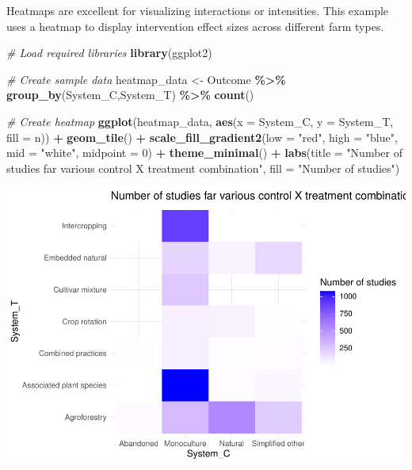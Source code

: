 \documentclass[
]{book}
\newenvironment{Shaded}{\begin{snugshade}}{\end{snugshade}}
\newcommand{\AttributeTok}[1]{\textcolor[rgb]{0.13,0.29,0.53}{#1}}
\newcommand{\CommentTok}[1]{\textcolor[rgb]{0.56,0.35,0.01}{\textit{#1}}}
\newcommand{\DecValTok}[1]{\textcolor[rgb]{0.00,0.00,0.81}{#1}}
\newcommand{\FunctionTok}[1]{\textcolor[rgb]{0.13,0.29,0.53}{\textbf{#1}}}
\newcommand{\NormalTok}[1]{#1}
\newcommand{\OtherTok}[1]{\textcolor[rgb]{0.56,0.35,0.01}{#1}}
\newcommand{\SpecialCharTok}[1]{\textcolor[rgb]{0.81,0.36,0.00}{\textbf{#1}}}
\newcommand{\StringTok}[1]{\textcolor[rgb]{0.31,0.60,0.02}{#1}}
\begin{document}
Heatmaps are excellent for visualizing interactions or intensities.
This example uses a heatmap to display intervention effect sizes across different farm types.

\begin{Shaded}
\begin{Highlighting}[]
\CommentTok{\# Load required libraries}
\FunctionTok{library}\NormalTok{(ggplot2)}

\CommentTok{\# Create sample data}
\NormalTok{heatmap\_data }\OtherTok{\textless{}{-}}\NormalTok{ Outcome }\SpecialCharTok{\%\textgreater{}\%} 
  \FunctionTok{group\_by}\NormalTok{(System\_C,System\_T) }\SpecialCharTok{\%\textgreater{}\%} 
  \FunctionTok{count}\NormalTok{()}

\CommentTok{\# Create heatmap}
\FunctionTok{ggplot}\NormalTok{(heatmap\_data, }\FunctionTok{aes}\NormalTok{(}\AttributeTok{x =}\NormalTok{ System\_C, }\AttributeTok{y =}\NormalTok{ System\_T, }\AttributeTok{fill =}\NormalTok{ n)) }\SpecialCharTok{+}
  \FunctionTok{geom\_tile}\NormalTok{() }\SpecialCharTok{+}
  \FunctionTok{scale\_fill\_gradient2}\NormalTok{(}\AttributeTok{low =} \StringTok{"red"}\NormalTok{, }\AttributeTok{high =} \StringTok{"blue"}\NormalTok{, }\AttributeTok{mid =} \StringTok{"white"}\NormalTok{, }\AttributeTok{midpoint =} \DecValTok{0}\NormalTok{) }\SpecialCharTok{+}
  \FunctionTok{theme\_minimal}\NormalTok{() }\SpecialCharTok{+}
  \FunctionTok{labs}\NormalTok{(}\AttributeTok{title =} \StringTok{"Number of studies far various control X treatment combination"}\NormalTok{,}
       \AttributeTok{fill =} \StringTok{"Number of studies"}\NormalTok{)}
\end{Highlighting}
\end{Shaded}

\includegraphics{_main_files/figure-latex/unnamed-chunk-11-1.pdf}
\end{document}
